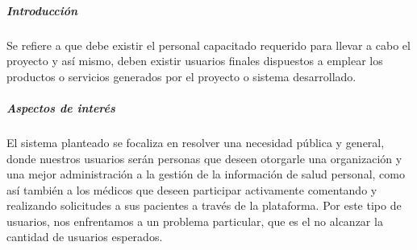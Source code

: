 \subparagraph{Introducción}

Se refiere a que debe existir el personal capacitado requerido para llevar a cabo el proyecto y así mismo, deben existir usuarios finales dispuestos a emplear los productos o servicios generados por el proyecto o sistema desarrollado. %

\subparagraph{Aspectos de interés}



El sistema planteado se focaliza en resolver una necesidad pública y general, donde nuestros usuarios serán personas que deseen otorgarle una organización y una mejor administración a la gestión de la información de salud personal, como así también a los médicos que deseen participar activamente comentando y realizando solicitudes a sus pacientes a través de la plataforma.
Por este tipo de usuarios, nos enfrentamos a un problema particular, que es el no alcanzar la cantidad de usuarios esperados.

